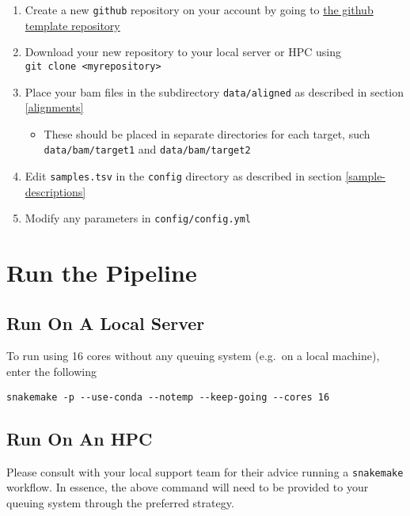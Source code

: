 \documentclass[
]{book}
\providecommand{\tightlist}{%
  \setlength{\itemsep}{0pt}\setlength{\parskip}{0pt}}
\begin{document}
\begin{enumerate}
\def\labelenumi{\arabic{enumi}.}
\tightlist
\item
  Create a new \texttt{github} repository on your account by going to \href{https://github.com/steveped/GRAVI/generate}{the github template repository}
\item
  Download your new repository to your local server or HPC using \texttt{git\ clone\ \textless{}myrepository\textgreater{}}
\item
  Place your bam files in the subdirectory \texttt{data/aligned} as described in section \ref{alignments}

  \begin{itemize}
  \tightlist
  \item
    These should be placed in separate directories for each target, such \texttt{data/bam/target1} and \texttt{data/bam/target2}
  \end{itemize}
\item
  Edit \texttt{samples.tsv} in the \texttt{config} directory as described in section \ref{sample-descriptions}
\item
  Modify any parameters in \texttt{config/config.yml}
\end{enumerate}

\hypertarget{quick-run}{%
\section{Run the Pipeline}\label{quick-run}}

\hypertarget{run-on-a-local-server}{%
\subsection{Run On A Local Server}\label{run-on-a-local-server}}

To run using 16 cores without any queuing system (e.g.~on a local machine), enter the following

\begin{verbatim}
snakemake -p --use-conda --notemp --keep-going --cores 16
\end{verbatim}

\hypertarget{run-on-an-hpc}{%
\subsection{Run On An HPC}\label{run-on-an-hpc}}

Please consult with your local support team for their advice running a \texttt{snakemake} workflow.
In essence, the above command will need to be provided to your queuing system through the preferred strategy.
\end{document}
